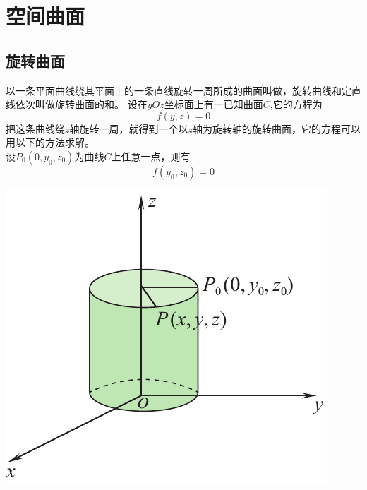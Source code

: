 \section{空间曲面}
\subsection{旋转曲面}


\noindent
\begin{minipage}{0.65\linewidth}
\hspace*{2em}以一条平面曲线绕其平面上的一条直线旋转一周所成的曲面叫做，旋转曲线和定直线依次叫做旋转曲面的和。
\hspace*{2em} 设在$yOz$坐标面上有一已知曲面$C$,它的方程为
\begin{equation}
	f(y,z)=0
\end{equation}
把这条曲线绕$z$轴旋转一周，就得到一个以$z$轴为旋转轴的旋转曲面，它的方程可以用以下的方法求解。\\
设$P_0(0,y_0,z_0)$为曲线$C$上任意一点，则有
\begin{equation}
	f(y_0,z_0)=0
\end{equation}
\end{minipage}
\begin{minipage}{0.35\linewidth}
	\centering
	\includegraphics[width = 0.9\linewidth]{pic/C-5/yz}
	\vspace*{-1em}
	\label{旋转曲面}
\end{minipage}

